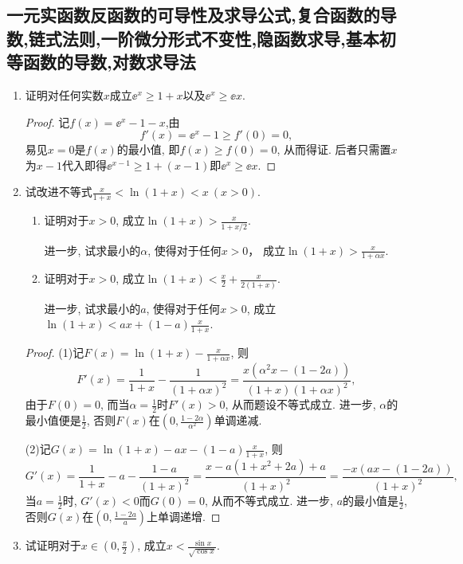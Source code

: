 \subsection{一元实函数反函数的可导性及求导公式,复合函数的导数,链式法则,一阶微分形式不变性,隐函数求导,基本初等函数的导数,对数求导法}
\begin{2a}
\begin{enumerate}
\item 证明对任何实数\(x\)成立\(\ee^x\geqslant 1+x\)以及\(\ee^x\geqslant \ee x\).
\begin{proof}
记\(f(x)=\ee^x-1-x\),由\[f'(x)=\ee^x-1\geqslant f'(0)=0,\]
易见\(x=0\)是\(f(x)\)的最小值, 即\(f(x)\geqslant f(0)=0\), 从而得证. 
后者只需置\(x\)为\(x-1\)代入即得\(\ee^{x-1}\geqslant 1+(x-1)\)即\(\ee^{x}\geqslant\ee x\).
\end{proof}
\item 试改进不等式\(\frac{x}{1+x}<\ln(1+x)<x\ (x>0)\).
\begin{enumerate}[label=(\arabic*)]
\item 证明对于\(x>0\), 成立\(\ln (1+x)>\frac{x}{1+x/2}\).

 进一步, 试求最小的\(\alpha\), 使得对于任何\(x>0\)，
 成立\(\ln(1+x)>\frac{x}{1+\alpha x}\).
\item 证明对于\(x>0\), 成立\(\ln (1+x)<\frac{x}{2}+\frac{x}{2(1+x)}\).

进一步, 试求最小的\(a\), 使得对于任何\(x>0\), 成立\(\ln (1+x)<ax+(1-a)\frac{x}{1+x}\).
\end{enumerate}
\begin{proof}
(1)记\(F(x)=\ln(1+x)-\frac{x}{1+\alpha x}\), 则
\[F'(x)=\frac{1}{1+x}-\frac{1}{(1+\alpha x)^2}=\frac{x(\alpha^2x-(1-2a))}{(1+x)(1+\alpha x)^2},\]
由于\(F(0)=0\), 而当\(\alpha=\frac{1}{2}\)时\(F'(x)>0\), 从而题设不等式成立. 
进一步, \(\alpha\)的最小值便是\(\frac{1}{2}\), 
否则\(F(x)\)在\(\left(0,\frac{1-2\alpha}{\alpha^2}\right)\)单调递减.

(2)记\(G(x)=\ln(1+x)-ax-(1-a)\frac{x}{1+x}\), 则
\[G'(x)=\frac{1}{1+x}-a-\frac{1-a}{(1+x)^2}
=\frac{x-a(1+x^2+2a)+a}{(1+x)^2}=\frac{-x(ax-(1-2a))}{(1+x)^2},\]
当\(a=\frac{1}{2}\)时, \(G'(x)<0\)而\(G(0)=0\), 从而不等式成立. 
进一步, \(a\)的最小值是\(\frac{1}{2}\), 否则\(G(x)\)在\(\left(0,\frac{1-2a}{a}\right)\)上单调递增.
\end{proof}
\item 试证明对于\(x\in\left(0,\frac{\pi}{2}\right)\), 成立\(x<\frac{\sin x}{\sqrt{\cos x}}\). 


\end{enumerate}
\end{2a}

